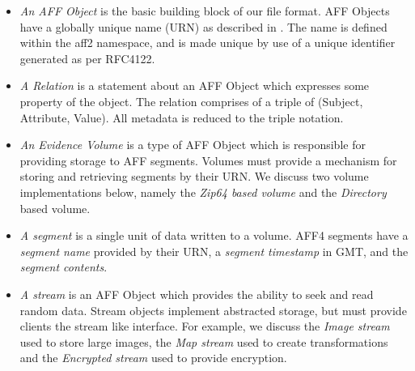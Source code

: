 \documentclass[10pt, conference]{IEEEtran}
\begin{document}
\begin{itemize}
\item \emph{An AFF Object} is the basic building block of our
file format. AFF Objects have a globally unique name (URN) as described in
\cite{RFC1737}. The name is defined within the aff2 namespace, and is
made unique by use of a unique identifier generated as per
RFC4122\cite{rfc4122}.

\item \emph{A Relation} is a statement about an AFF Object which
expresses some property of the object. The relation comprises of a
triple of (Subject, Attribute, Value). All metadata is reduced to the
triple notation.

\item \emph{An Evidence Volume} is a type of AFF Object which is
responsible for providing storage to AFF segments. Volumes must
provide a mechanism for storing and retrieving segments by their
URN. We discuss two volume implementations below, namely the {\em
Zip64 based volume} and the {\em Directory} based volume.

\item \emph{A segment} is a single unit of data written to a volume. AFF4
  segments have a \emph{segment name} provided by their URN, a
  \emph{segment timestamp} in GMT, and the \emph{segment contents}.

\item \emph{A stream} is an AFF Object which provides the ability to
seek and read random data. Stream objects implement abstracted
storage, but must provide clients the stream like interface. For
example, we discuss the {\em Image stream} used to store large images,
the {\em Map stream} used to create transformations and the {\em
Encrypted stream} used to provide encryption.






\end{itemize}
\end{document}
